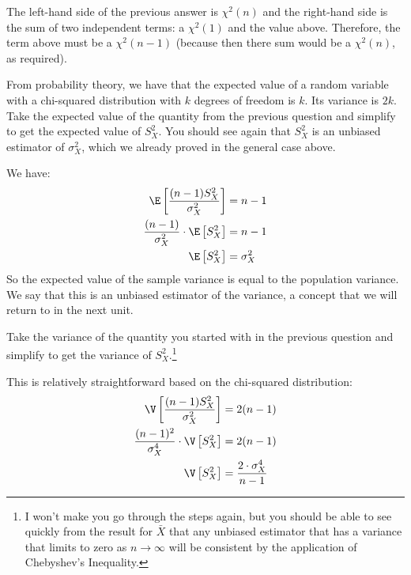 
The left-hand side of the previous answer is $\chi^2(n)$ and the right-hand
side is the sum of two independent terms: a $\chi^2(1)$ and the value above. Therefore,
the term above must be a $\chi^2(n-1)$ (because then there sum would be a $\chi^2(n)$,
as required). 


From probability theory, we have that the expected value of a random variable with
a chi-squared distribution with $k$ degrees of freedom is $k$. Its variance is $2k$.
Take the expected value of the quantity from the previous question and
simplify to get the expected value of $S_X^2$. You should see again that $S_X^2$ is
an unbiased estimator of $\sigma_X^2$, which we already proved in the general case
above.


We have:
\begin{align*}
\E \left[ \frac{(n-1) S_X^2}{\sigma_X^2} \right] &= n-1 \\
\frac{(n-1)}{\sigma_X^2} \cdot \E \left[ S_X^2 \right] &= n-1 \\
\E \left[ S_X^2 \right] &= \sigma_X^2
\end{align*}
So the expected value of the sample variance is equal to the population variance.
We say that this is an unbiased estimator of the variance, a concept that we will
return to in the next unit.


Take the variance of the quantity you started with in the previous question and
simplify to get the variance of $S_X^2$.\footnote{
  I won't make you go through the steps again, but you should be able to see
  quickly from the result for $\bar{X}$ that any unbiased estimator that has
  a variance that limits to zero as $n\rightarrow\infty$ will be consistent
  by the application of Chebyshev's Inequality.
}


This is relatively straightforward based on the chi-squared distribution:
\begin{align*}
\V \left[ \frac{(n-1) S_X^2}{\sigma_X^2} \right] &= 2(n-1) \\
\frac{(n-1)^2}{\sigma_X^4} \cdot \V \left[ S_X^2 \right] &= 2(n-1) \\
\V \left[ S_X^2 \right] &= \frac{2 \cdot \sigma_X^4}{n-1}
\end{align*}


